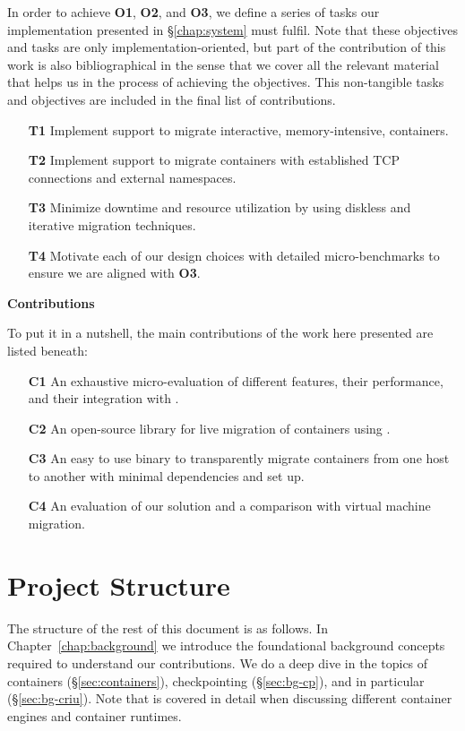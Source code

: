 In order to achieve \textbf{O1}, \textbf{O2}, and \textbf{O3}, we define a series of tasks our implementation presented in \S\ref{chap:system} must fulfil.
Note that these objectives and tasks are only implementation-oriented, but part of the contribution of this work is also bibliographical in the sense that we cover all the relevant material that helps us in the process of achieving the objectives.
This non-tangible tasks and objectives are included in the final list of contributions.
\begin{itemize}
    \item[\textbf{T1}] Implement support to migrate interactive, memory-intensive, containers.
    \item[\textbf{T2}] Implement support to migrate containers with established TCP connections and external namespaces.
    \item[\textbf{T3}] Minimize downtime and resource utilization by using diskless and iterative migration techniques.
    \item[\textbf{T4}] Motivate each of our design choices with detailed micro-benchmarks to ensure we are aligned with \textbf{O3}.
\end{itemize}

\textbf{Contributions}

To put it in a nutshell, the main contributions of the work here presented are listed beneath:
\begin{itemize}
    \item[\textbf{C1}] An exhaustive micro-evaluation of different \criu features, their performance, and their integration with \runc.
    \item[\textbf{C2}] An open-source library for live migration of \runc containers using \criu.
    \item[\textbf{C3}] An easy to use binary to transparently migrate containers from one host to another with minimal dependencies and set up.
    \item[\textbf{C4}] An evaluation of our solution and a comparison with virtual machine migration.
\end{itemize}

\section{Project Structure}

The structure of the rest of this document is as follows.
In Chapter~\ref{chap:background} we introduce the foundational background concepts required to understand our contributions.
We do a deep dive in the topics of containers (\S\ref{sec:containers}), checkpointing (\S\ref{sec:bg-cp}), and \criu in particular (\S\ref{sec:bg-criu}).
Note that \runc is covered in detail when discussing different container engines and container runtimes.

